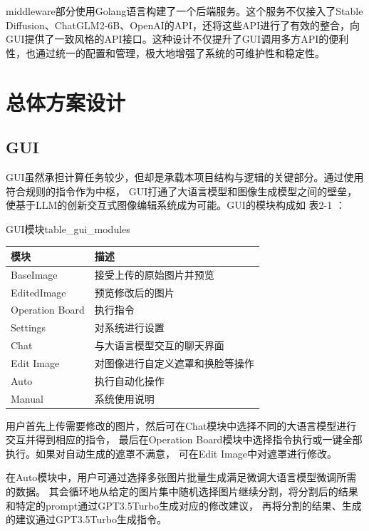 \documentclass[a4paper,AutoFakeBold,oneside,12pt]{book}
\begin{document}
middleware部分使用Golang语言构建了一个后端服务。这个服务不仅接入了Stable Diffusion、ChatGLM2-6B、OpenAI的API，还将这些API进行了有效的整合，向GUI提供了一致风格的API接口。这种设计不仅提升了GUI调用多方API的便利性，也通过统一的配置和管理，极大地增强了系统的可维护性和稳定性。

\chapter{总体方案设计} %
\section{GUI}
GUI虽然承担计算任务较少，但却是承载本项目结构与逻辑的关键部分。通过使用符合规则的指令作为中枢，
GUI打通了大语言模型和图像生成模型之间的壁垒，使基于LLM的创新交互式图像编辑系统成为可能。GUI的模块构成如 表2-1 ：
\begin{bupttable}{GUI模块}{table_gui_modules}
    \begin{tabular}{|l|l|}
        \hline \textbf{模块} & \textbf{描述} \\
        \hline BaseImage & 接受上传的原始图片并预览  \\
        \hline EditedImage & 预览修改后的图片 \\
        \hline Operation Board & 执行指令  \\
		\hline Settings & 对系统进行设置  \\
		\hline Chat & 与大语言模型交互的聊天界面  \\
		\hline Edit Image & 对图像进行自定义遮罩和换脸等操作  \\
		\hline Auto & 执行自动化操作  \\
		\hline Manual & 系统使用说明  \\
        \hline
    \end{tabular}
\end{bupttable}

用户首先上传需要修改的图片，然后可在Chat模块中选择不同的大语言模型进行交互并得到相应的指令，
最后在Operation Board模块中选择指令执行或一键全部执行。如果对自动生成的遮罩不满意，
可在Edit Image中对遮罩进行修改。

在Auto模块中，用户可通过选择多张图片批量生成满足微调大语言模型微调所需的数据。
其会循环地从给定的图片集中随机选择图片继续分割，将分割后的结果和特定的prompt通过GPT3.5Turbo生成对应的修改建议，
再将分割的结果、生成的建议通过GPT3.5Turbo生成指令。
\end{document}
